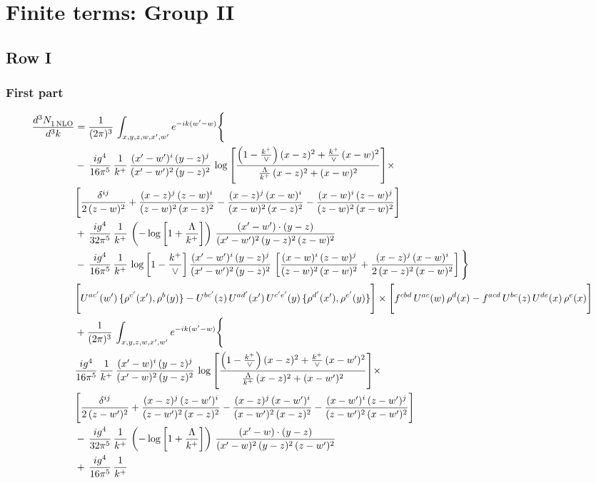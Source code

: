 \documentclass[9pt]{article}
\numberwithin{equation}{section}
\begin{document}
\section{Finite terms: Group II}
\subsection{Row I}
\subsubsection{First part}
\begin{align}
 \frac{d^{3}N_{1\,\rm NLO}^{\rm}}{d^{3}k}  & =    \frac{1}{(2\pi)^{3}}\,\int_{x,y,z,w,x',w^{\prime}} e^{-ik(w^{\prime}-w)}\Bigg\{ \notag \\ & -\, \frac{ig^{4}}{16\pi^{5}}\,\frac{1}{k^{+}}\, \frac{(x'-w')^{i}\,(y-z)^{j}}{(x'-w')^{2}\,(y-z)^{2}}\,\log{\left[\frac{\left(1-\frac{k^{+}}{\vee}\right)(x-z)^{2}+\frac{k^{+}}{\vee}\,(x-w)^{2}}{\frac{\Lambda}{k^{+}}\,(x-z)^{2}+(x-w)^{2}}\right]}\times\notag \\ &  \Bigg[\frac{\delta^{ij}}{2\,(z-w)^{2}}+\frac{(x-z)^{j}\,(z-w)^{i}}{(z-w)^{2}\,(x-z)^{2}}-\frac{(x-z)^{j}\,(x-w)^{i}}{(x-w)^{2}\,(x-z)^{2}}-\frac{(x-w)^{i}\,(z-w)^{j}}{(z-w)^{2}\,(x-w)^{2}}\Bigg]\notag \\ & +\,\frac{ig^{4}}{32\pi^{5}}\,\frac{1}{k^{+}}\,\left(-\log{\left[1+\frac{\Lambda}{k^{+}}\right]}\right)\, \frac{(x'-w')\cdot (y-z)}{(x'-w')^{2}\,(y-z)^{2}\,(z-w)^{2}}\notag \\ & -\, \frac{ig^{4}}{16\pi^{5}}\,\frac{1}{k^{+}}\, \log{\left[1-\frac{k^{+}}{\vee}\right]}\,\frac{(x'-w')^{i}\,(y-z)^{j}}{(x'-w')^{2}\,(y-z)^{2}}\,\left[\frac{(x-w)^{i}\,(z-w)^{j}}{(z-w)^{2}\,(x-w)^{2}}+\frac{(x-z)^{j}\,(x-w)^{i}}{2\,(x-z)^{2}\, (x-w)^{2}}\right]\Bigg\} \notag \\ & \Bigg[U^{ac'}(w')\,\{\rho^{c'}(x'),\rho^{b}(y)\}-U^{bc'}(z)\,U^{ad'}(x')\,U^{c'e'}(y)\, \{\rho^{d'}(x'),\rho^{e'}(y)\}\Bigg]\times \Bigg[f^{cbd}\,U^{ac}(w)\,\rho^{d}(x)-f^{acd}\, U^{bc}(z)\,U^{de}(x)\,\rho^{e}(x)\Bigg]\notag \\ & + \frac{1}{(2\pi)^{3}}\,\int_{x,y,z,w,x',w^{\prime}} e^{-ik(w^{\prime}-w)}\Bigg\{ \notag \\ &  \frac{ig^{4}}{16\pi^{5}}\,\frac{1}{k^{+}}\, \frac{(x'-w)^{i}\,(y-z)^{j}}{(x'-w)^{2}\,(y-z)^{2}}\,\log{\left[\frac{\left(1-\frac{k^{+}}{\vee}\right)(x-z)^{2}+\frac{k^{+}}{\vee}\,(x-w')^{2}}{\frac{\Lambda}{k^{+}}\,(x-z)^{2}+(x-w')^{2}}\right]}\times\notag \\ &  \Bigg[\frac{\delta^{ij}}{2\,(z-w')^{2}}+\frac{(x-z)^{j}\,(z-w')^{i}}{(z-w')^{2}\,(x-z)^{2}}-\frac{(x-z)^{j}\,(x-w')^{i}}{(x-w')^{2}\,(x-z)^{2}}-\frac{(x-w')^{i}\,(z-w')^{j}}{(z-w')^{2}\,(x-w')^{2}}\Bigg]\notag \\ & -\,\frac{ig^{4}}{32\pi^{5}}\,\frac{1}{k^{+}}\,\left(-\log{\left[1+\frac{\Lambda}{k^{+}}\right]}\right)\, \frac{(x'-w)\cdot (y-z)}{(x'-w)^{2}\,(y-z)^{2}\,(z-w')^{2}}\notag \\ & +\,\frac{ig^{4}}{16\pi^{5}}\,\frac{1}{k^{+}}\, 
\end{align}
\end{document}
